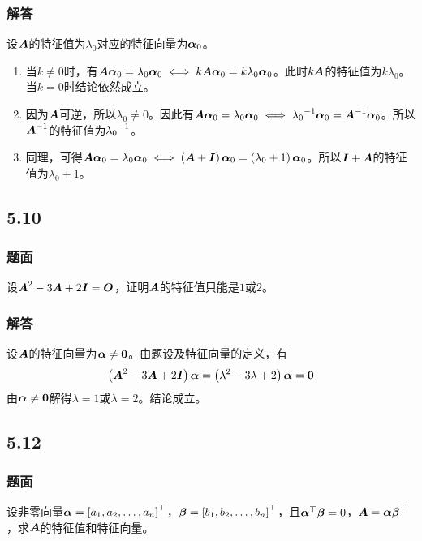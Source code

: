 \documentclass[9pt,xcolor=svgnames]{beamer} %
\begin{document}
\begin{frame}
    \frametitle{解答}
    设\(\boldsymbol{A}\)的特征值为\(\lambda_0\)对应的特征向量为\(\boldsymbol{\alpha}_0\)。
    \begin{enumerate}
        \item 当\(k\neq0\)时，有\(\boldsymbol{A}\boldsymbol{\alpha}_0=\lambda_0\boldsymbol{\alpha}_0\iff k\boldsymbol{A}\boldsymbol{\alpha}_0=k\lambda_0\boldsymbol{\alpha}_0\)。此时\(k\boldsymbol{A}\)的特征值为\(k\lambda_0\)。当\(k=0\)时结论依然成立。\pause
        \item 因为\(\boldsymbol{A}\)可逆，所以\(\lambda_0\neq0\)。因此有\(\boldsymbol{A}\boldsymbol{\alpha}_0=\lambda_0\boldsymbol{\alpha}_0\iff{\lambda_0}^{-1}\boldsymbol{\alpha}_0={\boldsymbol{A}}^{-1}\boldsymbol{\alpha}_0\)。所以\({\boldsymbol{A}}^{-1}\)的特征值为\({\lambda_0}^{-1}\)。\pause
        \item 同理，可得\(\boldsymbol{A}\boldsymbol{\alpha}_0=\lambda_0\boldsymbol{\alpha}_0\iff\left( \boldsymbol{A}+\boldsymbol{I} \right)\boldsymbol{\alpha}_0=\left( \lambda_0+1 \right)\boldsymbol{\alpha}_0\)。所以\(\boldsymbol{I}+\boldsymbol{A}\)的特征值为\(\lambda_0+1\)。
    \end{enumerate}
\end{frame}

\subsection*{5.10}
\begin{frame}
    \frametitle{题面}
    设\(\boldsymbol{A}^2-3\boldsymbol{A}+2\boldsymbol{I}=\boldsymbol{O}\)，证明\(\boldsymbol{A}\)的特征值只能是\(1\)或\(2\)。
\end{frame}

\begin{frame}
    \frametitle{解答}
    设\(\boldsymbol{A}\)的特征向量为\(\boldsymbol{\alpha}\neq\boldsymbol{0}\)。由题设及特征向量的定义，有
    \begin{equation*}
        \left( \boldsymbol{A}^2-3\boldsymbol{A}+2\boldsymbol{I} \right)\boldsymbol{\alpha}=\left( \lambda^2-3\lambda+2 \right)\boldsymbol{\alpha}=\boldsymbol{0}
    \end{equation*}
    \pause
    由\(\boldsymbol{\alpha}\neq\boldsymbol{0}\)解得\(\lambda=1\)或\(\lambda=2\)。结论成立。
\end{frame}

\subsection*{5.12}
\begin{frame}
    \frametitle{题面}
    设非零向量\(\boldsymbol{\alpha}=\left[ {a}_1,{a}_2,\dots,{a}_{n} \right]^\top\)，\(\boldsymbol{\beta}=\left[ {b}_1,{b}_2,\dots,{b}_{n} \right]^\top\)，且\(\boldsymbol{\alpha}^\top\boldsymbol{\beta}=0\)，\(\boldsymbol{A}=\boldsymbol{\alpha}\boldsymbol{\beta}^\top\)，求\(\boldsymbol{A}\)的特征值和特征向量。
\end{frame}
\end{document}
